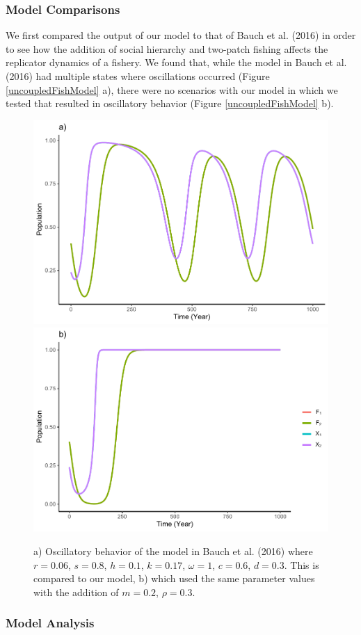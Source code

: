 \documentclass[
]{article}
\begin{document}
\hypertarget{model-comparisons}{%
\subsubsection{Model Comparisons}\label{model-comparisons}}

We first compared the output of our model to that of Bauch et al. (2016) in order to see how the addition of social hierarchy and two-patch fishing affects the replicator dynamics of a fishery. We found that, while the model in Bauch et al. (2016) had multiple states where oscillations occurred (Figure \ref{uncoupledFishModel} a), there were no scenarios with our model in which we tested that resulted in oscillatory behavior (Figure \ref{uncoupledFishModel} b).



\begin{figure}
\includegraphics[width=0.5\linewidth]{Wulfing_Thesis_files/figure-latex/uncoupledFishModel-1} \includegraphics[width=0.5\linewidth]{Wulfing_Thesis_files/figure-latex/uncoupledFishModel-2} \caption{a) Oscillatory behavior of the model in Bauch et al. (2016) where \(r = 0.06\), \(s = 0.8\), \(h = 0.1\), \(k = 0.17\), \(\omega = 1\), \(c = 0.6\), \(d = 0.3\). This is compared to our model, b) which used the same parameter values with the addition of \(m = 0.2\), \(\rho = 0.3\). \label{uncoupledFishModel}}\label{fig:uncoupledFishModel}
\end{figure}

\hypertarget{model-analysis-1}{%
\subsubsection{Model Analysis}\label{model-analysis-1}}
\end{document}
